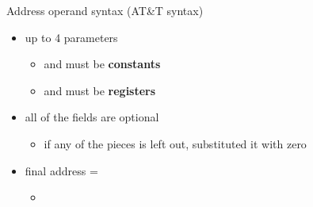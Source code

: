 \begin{frame}
  \begin{block}{Address operand syntax \scriptsize{(AT\&T syntax)}}
    \begin{itemize}
    \item up to 4 parameters
      \begin{itemize}
      \item {} and  must be
          \textbf{constants}
      \item {} and  must be
          \textbf{registers}
      \end{itemize}
    \item all of the fields are optional
      \begin{itemize}
      \item if any of the pieces is left out, substituted it with zero
      \end{itemize}
    \item final address =
      \begin{itemize}
      \item[] \scriptsize{}
      \end{itemize}
    \end{itemize}
  \end{block}
\end{frame}

